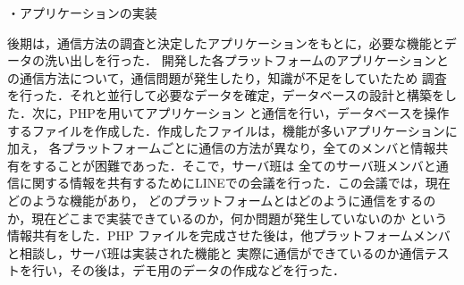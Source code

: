 \par
・アプリケーションの実装
\par
後期は，通信方法の調査と決定したアプリケーションをもとに，必要な機能とデータの洗い出しを行った．
開発した各プラットフォームのアプリケーションとの通信方法について，通信問題が発生したり，知識が不足をしていたため
調査を行った．それと並行して必要なデータを確定，データベースの設計と構築をした．次に，PHPを用いてアプリケーション
と通信を行い，データベースを操作するファイルを作成した．作成したファイルは，機能が多いアプリケーションに加え，
各プラットフォームごとに通信の方法が異なり，全てのメンバと情報共有をすることが困難であった．そこで，サーバ班は
全てのサーバ班メンバと通信に関する情報を共有するためにLINEでの会議を行った．この会議では，現在どのような機能があり，
どのプラットフォームとはどのように通信をするのか，現在どこまで実装できているのか，何か問題が発生していないのか
という情報共有をした．PHP ファイルを完成させた後は，他プラットフォームメンバと相談し，サーバ班は実装された機能と
実際に通信ができているのか通信テストを行い，その後は，デモ用のデータの作成などを行った．


